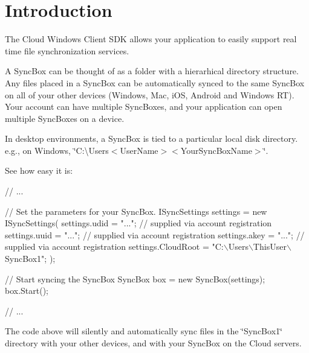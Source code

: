 \hypertarget{index_intro_sec}{}\section{Introduction}\label{index_intro_sec}
The Cloud Windows Client S\-D\-K allows your application to easily support real time file synchronization services.

A Sync\-Box can be thought of as a folder with a hierarhical directory structure. Any files placed in a Sync\-Box can be automatically synced to the same Sync\-Box on all of your other devices (Windows, Mac, i\-O\-S, Android and Windows R\-T). Your account can have multiple Sync\-Boxes, and your application can open multiple Sync\-Boxes on a device.

In desktop environments, a Sync\-Box is tied to a particular local disk directory. e.\-g., on Windows, \char`\"{}\-C\-:\textbackslash{}\-Users$<$\-User\-Name$>$$<$\-Your\-Sync\-Box\-Name$>$\char`\"{}.

See how easy it is\-:


\begin{DoxyCode}
\textcolor{comment}{// ...}

\textcolor{comment}{// Set the parameters for your SyncBox.}
ISyncSettings settings = \textcolor{keyword}{new} ISyncSettings(
            settings.udid = \textcolor{stringliteral}{"..."};          \textcolor{comment}{// supplied via account
       registration}
            settings.uuid = \textcolor{stringliteral}{"..."};          \textcolor{comment}{// supplied via account
       registration}
            settings.akey = \textcolor{stringliteral}{"..."};          \textcolor{comment}{// supplied via account
       registration}
            settings.CloudRoot = \textcolor{stringliteral}{"C:\(\backslash\)Users\(\backslash\)ThisUser\(\backslash\)SyncBox1"};
        );

\textcolor{comment}{// Start syncing the SyncBox}
SyncBox box = \textcolor{keyword}{new} SyncBox(settings);
box.Start();

\textcolor{comment}{// ...}
\end{DoxyCode}


The code above will silently and automatically sync files in the \char`\"{}\-Sync\-Box1\char`\"{} directory with your other devices, and with your Sync\-Box on the Cloud servers.

